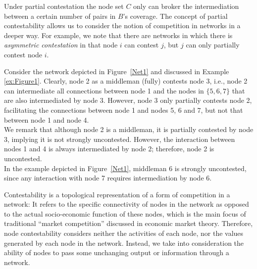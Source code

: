 Under partial contestation the node set $C$ only can broker the intermediation between a certain number of pairs in $B$'s coverage. The concept of partial contestability allows us to consider the notion of competition in networks in a deeper way. For example, we note that there are networks in which there is \emph{asymmetric contestation} in that node $i$ can contest $j$, but $j$ can only partially contest node $i$.
\begin{example}
Consider the network depicted in Figure~\ref{Net1} and discussed in Example \ref{ex:Figure1}. Clearly, node 2 as a middleman (fully) contests node 3, i.e., node 2 can intermediate all connections between node 1 and the nodes in $\{ 5,6,7 \}$ that are also intermediated by node 3. However, node 3 only partially contests node 2, facilitating the connections between node 1 and nodes 5, 6 and 7, but not that between node 1 and node 4.
\\
We remark that although node 2 is a middleman, it is partially contested by node 3, implying it is not strongly uncontested. However, the interaction between nodes 1 and 4 is always intermediated by node 2; therefore, node 2 is uncontested.
\\
In the example depicted in Figure~\ref{Net1}, middleman 6 is strongly uncontested, since any interaction with node 7 requires intermediation by node 6.
\end{example}
Contestability is a topological representation of a form of competition in a network: It refers to the specific connectivity of nodes in the network as opposed to the actual socio-economic function of these nodes, which is the main focus of traditional ``market competition'' discussed in economic market theory. Therefore, node contestability considers neither the activities of each node, nor the values generated by each node in the network. Instead, we take into consideration the ability of nodes to pass some unchanging output or information through a network.

